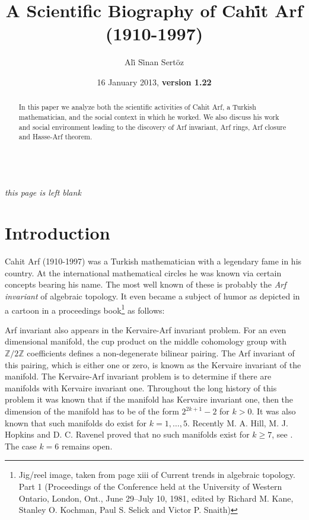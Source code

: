 \documentclass[12pt]{amsart}
\begin{document}
\title{A Scientific Biography of Cah{\.i}t Arf (1910-1997)}
\author{Al{\.i} S{\.i}nan Sert\"{o}z}
\address{Bilkent University, Department of Mathematics, 06800 Ankara, Turkey \\ {\tt http://www.bilkent.edu.tr/$\tilde{~}$sertoz}}
\date{16 January 2013, \textbf{version 1.22}}

\begin{abstract}
In this paper we analyze both the scientific activities of Cahit Arf, a Turkish mathematician, and the social context in which he worked. We also discuss his work and social environment leading to the discovery of Arf invariant, Arf rings, Arf closure and Hasse-Arf theorem.
\end{abstract}

\maketitle
\thispagestyle{empty}

\newpage
\thispagestyle{empty}
\mbox{} \\
{\small \it this page is left blank}
\newpage
\setcounter{page}{1}
\thispagestyle{plain}

\section{Introduction}
Cahit Arf (1910-1997) was a  Turkish mathematician with a legendary fame in his country. At the international mathematical circles he was known via certain concepts bearing his name. The most well known of these is probably the  \emph{Arf invariant} of algebraic topology. It even became a subject of humor as depicted in a cartoon in a proceedings book\footnote{Jig/reel image, taken from page xiii of Current trends in algebraic topology. Part 1 (Proceedings of the Conference held at the University of Western Ontario, London, Ont., June 29--July 10, 1981, edited by Richard M. Kane, Stanley O. Kochman, Paul S. Selick and Victor P. Snaith)} as follows:
\begin{center}
\end{center}

Arf invariant also appears in the Kervaire-Arf invariant problem. For an even dimensional manifold, the cup product on the middle cohomology group with ${\mathbb{Z}}/2{\mathbb{Z}}$ coefficients defines a non-degenerate bilinear pairing. The Arf invariant of this pairing, which is either one or zero, is known as the Kervaire invariant of the manifold. The Kervaire-Arf invariant problem is to determine if there are manifolds with Kervaire invariant one. Throughout the long history of this problem it was known that if the manifold has Kervaire invariant one, then the dimension of the manifold has to be of the form $2^{2k+1}-2$ for $k>0$. It was also known that such manifolds do exist for $k=1,\dots,5$. Recently M. A. Hill, M. J. Hopkins and D. C. Ravenel proved that no such manifolds exist for $k\geq 7$, see \cite{hill1,hill2,hill3}. The case $k=6$ remains open.
\end{document}
